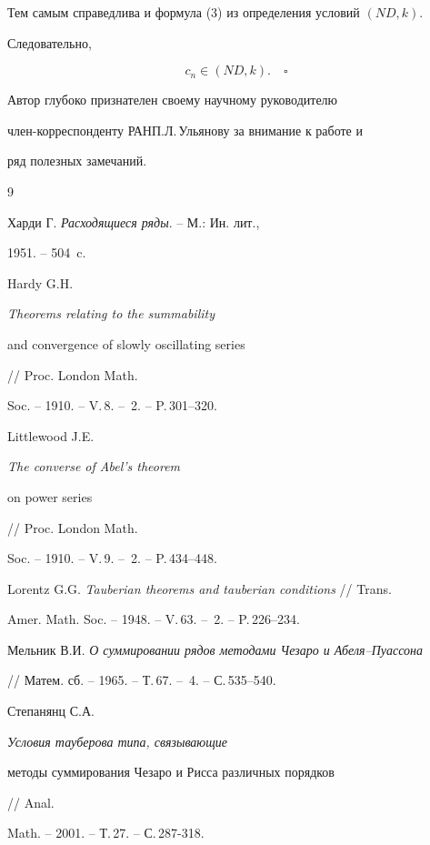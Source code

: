 Тем самым справедлива и формула (3) из определения условий $(ND, k)$. 


Следовательно,


$$


c_n \in (ND, k).\quad\square


$$





Автор глубоко признателен своему научному руководителю 


член-корреспонденту РАН\linebreak П.Л.\,Ульянову за внимание к работе и 


ряд полезных замечаний.





\begin{thebibliography}{9}







Харди Г. {\em Расходящиеся ряды}. -- М.: Ин. лит., 


1951. -- 504~c.




Hardy G.H. {\em Theorems relating to the summability 


and convergence of slowly oscillating series} // Proc. London Math. 


Soc. -- 1910. -- V.\,8. -- \No\,2. -- P.\,301--320.




Littlewood J.E. {\em The converse of Abel's theorem 


on power series} // Proc. London Math. 


Soc. -- 1910. -- V.\,9. -- \No\,2. -- P.\,434--448.




Lorentz G.G. {\em Tauberian theorems and tauberian conditions} // Trans. 


Amer. Math. Soc. -- 1948. -- V.\,63. -- \No\,2. -- P.\,226--234.




Мельник В.И. {\em О суммировании рядов методами Чезаро и Абеля--Пуассона}


// Матем. сб. -- 1965. -- Т.\,67. -- \No\,4. -- С.\,535--540.




Степанянц С.А. {\em Условия тауберова типа, связывающие 


методы суммирования Чезаро и Рисса различных порядков} // Anal.


Math. -- 2001. -- Т.\,27. -- С.\,287-318. 





\end{thebibliography}





\vskip 2cm












\label{end}





